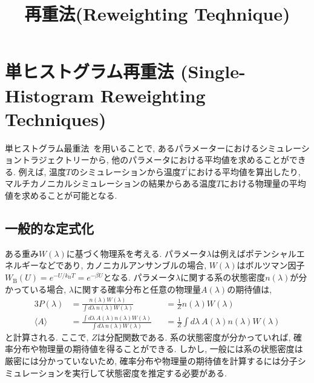 





\title{再重法(Reweighting Teqhnique)}

\maketitle
\section{単ヒストグラム再重法 (Single-Histogram Reweighting Techniques)}
単ヒストグラム最重法~\cite{Ferrenberg1988,Ferrenberg1989}を用いることで, あるパラメーターにおけるシミュレーショントラジェクトリーから, 他のパラメータにおける平均値を求めることができる. 
例えば, 温度$T$のシミュレーションから温度$T^{\prime}$における平均値を算出したり, マルチカノニカルシミュレーションの結果からある温度$T$における物理量の平均値を求めることが可能となる. 

\subsection{一般的な定式化}
ある重み$W(\lambda)$に基づく物理系を考える. 
パラメータ$\lambda$は例えばポテンシャルエネルギーなどであり, カノニカルアンサンブルの場合, $W(\lambda)$はボルツマン因子$W_{\mathrm{B}}(U) = e^{-U/k_{\mathrm{B}}T} = e^{-\beta U}$となる. 
パラメータ$\lambda$に関する系の状態密度$n(\lambda)$が分かっている場合, $\lambda$に関する確率分布と任意の物理量$A(\lambda)$の期待値は, 
\begin{alignat}{3}
    P(\lambda) &=
    \frac{n(\lambda)W(\lambda)}{\int d\lambda~ n(\lambda) W(\lambda)} &&=
    \frac{1}{Z} n(\lambda)W(\lambda)
    \label{Eq:ProbDist-Lambda}
    \\
    \langle A \rangle &=
    \frac{\int d\lambda~ A(\lambda)n(\lambda)W(\lambda)}{\int d\lambda~ n(\lambda) W(\lambda)} &&=
    \frac{1}{Z} \int d\lambda~ A(\lambda)n(\lambda)W(\lambda)
    \label{Eq:PhysAverage-Lambda}
\end{alignat}
と計算される. ここで, $Z$は分配関数である. 
系の状態密度が分かっていれば, 確率分布や物理量の期待値を得ることができる. 
しかし, 一般には系の状態密度は厳密には分かっていないため, 確率分布や物理量の期待値を計算するには分子シミュレーションを実行して状態密度を推定する必要がある. 


